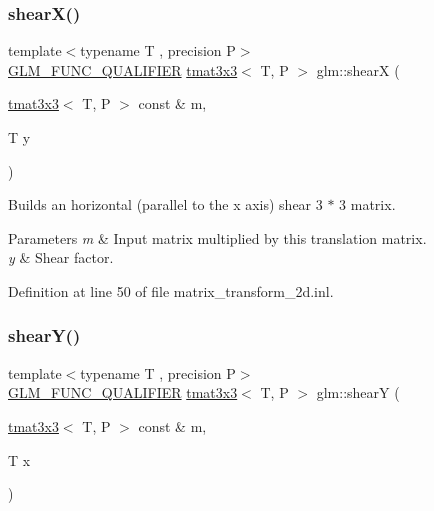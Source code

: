 \subsubsection{\texorpdfstring{shearX()}{shearX()}}
{\footnotesize\ttfamily template$<$typename T , precision P$>$ \\
\mbox{\hyperlink{setup_8hpp_a33fdea6f91c5f834105f7415e2a64407}{G\+L\+M\+\_\+\+F\+U\+N\+C\+\_\+\+Q\+U\+A\+L\+I\+F\+I\+ER}} \mbox{\hyperlink{structglm_1_1tmat3x3}{tmat3x3}}$<$ T, P $>$ glm\+::shearX (\begin{DoxyParamCaption}\item[{\mbox{\hyperlink{structglm_1_1tmat3x3}{tmat3x3}}$<$ T, P $>$ const \&}]{m,  }\item[{T}]{y }\end{DoxyParamCaption})}

Builds an horizontal (parallel to the x axis) shear 3 $\ast$ 3 matrix.


\begin{DoxyParams}{Parameters}
{\em m} & Input matrix multiplied by this translation matrix. \\
\hline
{\em y} & Shear factor. \\
\hline
\end{DoxyParams}


Definition at line 50 of file matrix\+\_\+transform\+\_\+2d.\+inl.

\mbox{\label{group__gtx__matrix__transform__2d_ga69bfb47d250df7464a5b14f2b95a9b4a}} 
\subsubsection{\texorpdfstring{shearY()}{shearY()}}
{\footnotesize\ttfamily template$<$typename T , precision P$>$ \\
\mbox{\hyperlink{setup_8hpp_a33fdea6f91c5f834105f7415e2a64407}{G\+L\+M\+\_\+\+F\+U\+N\+C\+\_\+\+Q\+U\+A\+L\+I\+F\+I\+ER}} \mbox{\hyperlink{structglm_1_1tmat3x3}{tmat3x3}}$<$ T, P $>$ glm\+::shearY (\begin{DoxyParamCaption}\item[{\mbox{\hyperlink{structglm_1_1tmat3x3}{tmat3x3}}$<$ T, P $>$ const \&}]{m,  }\item[{T}]{x }\end{DoxyParamCaption})}

